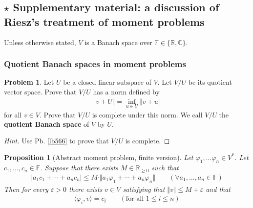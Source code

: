 \documentclass[12pt,b5paper,notitlepage]{article}
\theoremstyle{definition}
\newtheorem{prob}{\color{red}Problem}[section]
\newtheorem{sprob}[prob]{\color{red}$\star$ Problem}
\theoremstyle{plain}
\newtheorem{pp}[df]{Proposition}
\newcommand{\ovl}{\overline}
\newcommand{\bk}[1]{\langle {#1}\rangle}
\newcommand{\Cbb}{\mathbb C}
\newcommand{\Rbb}{\mathbb R}
\newcommand{\Fbb}{\mathbb F}
\newcommand{\eps}{\varepsilon}
\numberwithin{equation}{section}
\begin{document}
\begin{comment}
\begin{sprob}
Let $V$ be a normed vector space such that $V^*$ is separable (under the operator norm). Prove that $V$ is separable. Use this fact to give another proof that \eqref{eq205} is not surjective.
\end{sprob}


\begin{proof}[Hint]
Show that $\ovl B_{V^*}(0,1)$ is second countable under the weak-* topology. Then use Thm. \ref{lb482} and \ref{lb523}. 
\end{proof}
\end{comment}


\subsection{$\star$ Supplementary material: a discussion of Riesz's treatment of moment problems}\label{lb548}

Unless otherwise stated, $V$ is a Banach space over $\Fbb\in\{\Rbb,\Cbb\}$.


\subsubsection{Quotient Banach spaces in moment problems}




\begin{prob}
Let $U$ be a closed linear subspace of $V$. Let $V/U$ be its quotient vector space. Prove that $V/U$ has a norm defined by
\begin{align}
\Vert v+U\Vert=\inf_{u\in U}\Vert v+u\Vert  \label{eq216}
\end{align}
for all $v\in V$. Prove that $V/U$ is complete under this norm. We call $V/U$ the \textbf{quotient Banach space}  of $V$ by $U$.
\end{prob}

\begin{proof}[Hint]
Use Pb. \ref{lb566} to prove that $V/U$ is complete.
\end{proof}

\begin{pp}[Abstract moment problem, finite version]\label{lb546}
Let $\varphi_1,\dots\varphi_n\in V^*$. Let $c_1,\dots,c_n\in\Fbb$. Suppose that there exists $M\in\Rbb_{\geq0}$ such that
\begin{align}
|a_1c_1+\cdots+a_nc_n|\leq M\cdot\Vert a_1\varphi_1+\cdots+a_n\varphi_n\Vert\qquad(\forall a_1,\dots,a_n\in\Fbb)
\end{align}
Then for every $\eps>0$ there exists $v\in V$ satisfying that $\Vert v\Vert\leq M+\eps$ and that
\begin{align}
\bk{\varphi_i,v}=c_i\qquad(\text{for all }1\leq i\leq n) \label{eq213}
\end{align}
\end{pp}
\end{document}
